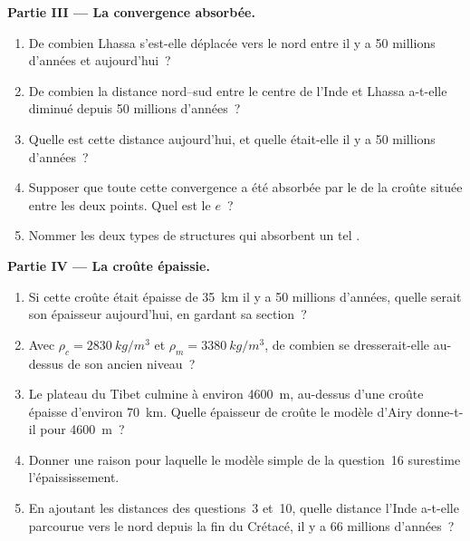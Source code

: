 \begin{problem}
\medskip
\noindent\textbf{Partie III --- La convergence absorbée.}
\begin{enumerate}[resume]
  \item De combien Lhassa s'est-elle déplacée vers le nord entre il y a 50
        millions d'années et aujourd'hui~?
  \item De combien la distance nord--sud entre le centre de l'Inde et
        Lhassa a-t-elle diminué depuis 50 millions d'années~?
  \item Quelle est cette distance aujourd'hui, et quelle était-elle il y a
        50 millions d'années~?
  \item Supposer que toute cette convergence a été absorbée par le
         de la croûte située entre les deux points. Quel
        est le  $e$~?
  \item Nommer les deux types de structures qui absorbent un tel
        .
\end{enumerate}

\medskip
\noindent\textbf{Partie IV --- La croûte épaissie.}
\begin{enumerate}[resume]
  \item Si cette croûte était épaisse de \qty{35}{km} il y a 50 millions
        d'années, quelle serait son épaisseur aujourd'hui, en gardant sa
        section~?
  \item Avec $\rho_c = \qty{2830}{kg/m^3}$ et $\rho_m = \qty{3380}{kg/m^3}$,
        de combien se dresserait-elle au-dessus de son ancien niveau~?
  \item Le plateau du Tibet culmine à environ \qty{4600}{m}, au-dessus d'une
        croûte épaisse d'environ \qty{70}{km}. Quelle épaisseur de croûte le
        modèle d'Airy donne-t-il pour \qty{4600}{m}~?
  \item Donner une raison pour laquelle le modèle simple de la question~16
        surestime l'épaississement.
  \item En ajoutant les distances des questions~3 et~10, quelle distance
        l'Inde a-t-elle parcourue vers le nord depuis la fin du Crétacé, il
        y a 66 millions d'années~?
\end{enumerate}
\end{problem}
